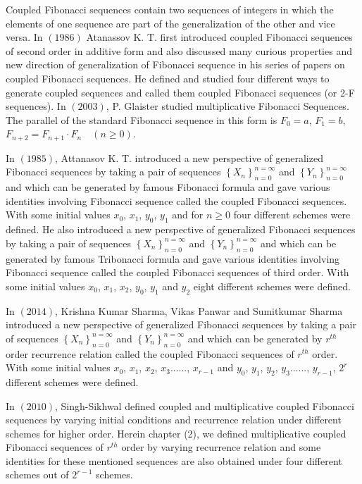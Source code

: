 \begin{large}
\noindent Coupled Fibonacci sequences contain two sequences of integers in which the elements of one sequence are part of the generalization of the other and vice versa. In $(1986)$ Atanassov K. T.\cite{Atanassov-2} first introduced coupled Fibonacci sequences of second order in additive form and also discussed many curious properties and new direction of generalization of Fibonacci sequence in his series of papers on coupled Fibonacci sequences. He defined and studied  four different ways to generate coupled sequences and called them coupled Fibonacci sequences (or 2-F sequences). In $(2003)$, P. Glaister\cite{glaister} studied  multiplicative Fibonacci Sequences. The parallel of the standard Fibonacci sequence in this form is
$F_0 = a$, $F_1 = b$, $F_{n+2} = F_{n+1}\cdot F_{n} \quad(n\geq 0)$.

\noindent In $(1985)$, Attanasov K. T.\cite{Atanassov-1} introduced a new perspective of generalized Fibonacci sequences by taking a pair of sequences $\left\{X_{n}\right\}_{n=0}^{n=\infty}$ and $\left\{Y_{n}\right\}_{n=0}^{n=\infty}$ and which can be generated by famous Fibonacci formula and gave various identities involving Fibonacci sequence called the coupled Fibonacci sequences. With some initial values $x_{0}$, $x_{1}$,  $y_{0}$, $y_{1}$ and for $n\geq 0$ four different schemes were defined. He also introduced a new perspective of generalized Fibonacci sequences by taking a pair of sequences $\left\{X_{n}\right\}_{n=0}^{n=\infty}$ and $\left\{Y_{n}\right\}_{n=0}^{n=\infty}$ and which can be generated by famous Tribonacci formula and gave various identities involving Fibonacci sequence called the coupled Fibonacci sequences of third order. With some initial values $x_{0}$, $x_{1}$, $x_{2}$, $y_{0}$, $y_{1}$ and $y_{2}$ eight different schemes were defined.

\noindent In $(2014)$, Krishna Kumar Sharma, Vikas Panwar and Sumitkumar Sharma\cite{krishna} introduced a new perspective of generalized Fibonacci sequences by taking a pair of sequences $\left\{X_{n}\right\}_{n=0}^{n=\infty}$ and $\left\{Y_{n}\right\}_{n=0}^{n=\infty}$ and which can be generated by $r^{th}$ order recurrence relation called the coupled Fibonacci sequences of $r^{th}$ order. With some initial values $x_{0}$, $x_{1}$, $x_{2}$, $x_{3}$......, $x_{r-1}$ and $y_{0}$, $y_{1}$, $y_{2}$, $y_{3}$......, $y_{r-1}$, $2^{r}$ different schemes were defined. 

\noindent In $(2010)$, Singh-Sikhwal \cite{singh-shikwal-1}  defined coupled and multiplicative coupled Fibonacci sequences by varying initial conditions and recurrence relation under different schemes for higher order. Herein chapter (2), we defined multiplicative coupled Fibonacci sequences of $r^{th}$ order by varying recurrence relation and  some identities for these mentioned sequences are also obtained under four different schemes out of ${2^{r - 1}}$ schemes.

\end{large}
